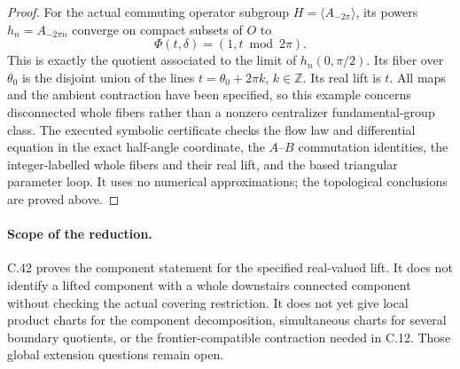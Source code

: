 \begin{proof}
For the actual commuting operator subgroup
$H=\langle A_{-2\pi}\rangle$, its powers
$h_n=A_{-2\pi n}$ converge on compact
subsets of $O$ to
\[
 \Phi(t,\delta)=(1,t\bmod2\pi).
                                                        \tag{C.42.7}
\]
This is exactly the quotient associated to
the limit of $h_n(0,\pi/2)$.
Its fiber over $\theta_0$ is the disjoint
union of the lines $t=\theta_0+2\pi k$,
$k\in\mathbb Z$. Its real lift is $t$.
All maps and the ambient contraction have
been specified, so this example concerns
disconnected whole fibers rather than a
nonzero centralizer fundamental-group class.
The executed symbolic certificate
checks the flow law and differential equation
in the exact half-angle coordinate,
the $A$--$B$ commutation identities, the
integer-labelled whole fibers and their real
lift, and the based triangular parameter loop.
It uses no numerical approximations; the
topological conclusions are proved above.
\end{proof}

\paragraph{Scope of the reduction.}
C.42 proves the component statement for the
specified real-valued lift. It does not
identify a lifted component with a whole
downstairs connected component without
checking the actual covering restriction.
It does not yet give local product charts
for the component decomposition, simultaneous
charts for several boundary quotients, or
the frontier-compatible contraction needed
in C.12. Those global extension questions
remain open.
